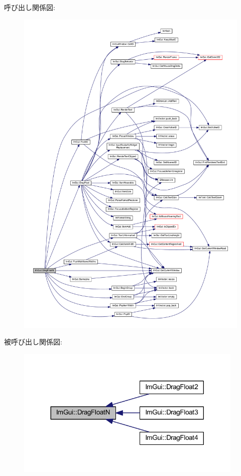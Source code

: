 呼び出し関係図\+:\nopagebreak
\begin{figure}[H]
\begin{center}
\leavevmode
\includegraphics[width=350pt]{namespace_im_gui_a2a2764b6f0b3291ad0df4d99127dd751_cgraph}
\end{center}
\end{figure}
被呼び出し関係図\+:\nopagebreak
\begin{figure}[H]
\begin{center}
\leavevmode
\includegraphics[width=308pt]{namespace_im_gui_a2a2764b6f0b3291ad0df4d99127dd751_icgraph}
\end{center}
\end{figure}
\mbox{\label{namespace_im_gui_ad6e3b0e5a2171679c53d6b18e16a460b}} 
